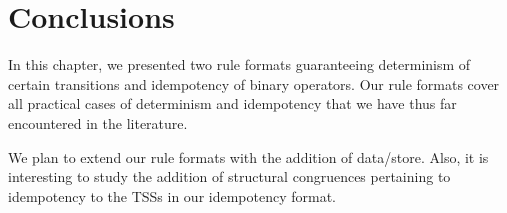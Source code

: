 \section{\label{sec::conc}Conclusions}
In this chapter, we presented two rule formats  guaranteeing determinism of certain transitions and idempotency of binary operators.
Our rule formats cover all practical cases of determinism and idempotency that we have thus far encountered in the literature.

We plan to extend our rule formats with the addition of data/store.
Also, it is interesting to study the addition of structural congruences pertaining to idempotency
to the TSSs in our idempotency format.  
